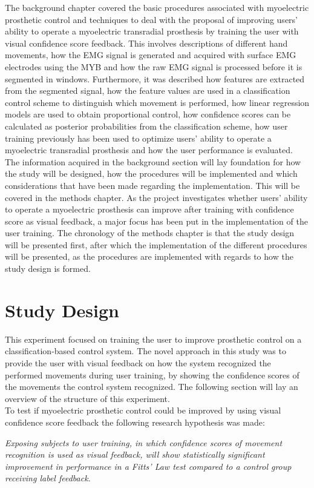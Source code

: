 The background chapter covered the basic procedures associated with myoelectric prosthetic control and techniques to deal with the proposal of improving users' ability to operate a myoelectric transradial prosthesis by training the user with visual confidence score feedback. This involves descriptions of different hand movements, how the EMG signal is generated and acquired with surface EMG electrodes using the MYB and how the raw EMG signal is processed before it is segmented in windows. Furthermore, it was described how features are extracted from the segmented signal, how the feature values are used in a classification control scheme to distinguish which movement is performed, how linear regression models are used to obtain proportional control, how confidence scores can be calculated as posterior probabilities from the classification scheme, how user training previously has been used to optimize users' ability to operate a myoelectric transradial prosthesis and how the user performance is evaluated. \\
The information acquired in the background section will lay foundation for how the study will be designed, how the procedures will be implemented and which considerations that have been made regarding the implementation. This will be covered in the methods chapter. As the project investigates whether users' ability to operate a myoelectric prosthesis can improve after training with confidence score as visual feedback, a major focus has been put in the implementation of the user training. The chronology of the methods chapter is that the study design will be presented first, after which the implementation of the different procedures will be presented, as the procedures are implemented with regards to how the study design is formed. 

\section{Study Design} \label{sec:M:studyDesign}

This experiment focused on training the user to improve prosthetic control on a classification-based control system. The novel approach in this study was to provide the user with visual feedback on how the system recognized the performed movements during user training, by showing the confidence scores of the movements the control system recognized. The following section will lay an overview of the structure of this experiment. \\
To test if myoelectric prosthetic control could be improved by using visual confidence score feedback the following research hypothesis was made: 
\begin{center}
	\textit{Exposing subjects to user training, in which confidence scores of movement recognition is used as visual feedback, will show statistically significant improvement in performance in a Fitts' Law test compared to a control group receiving label feedback.}
\end{center}


